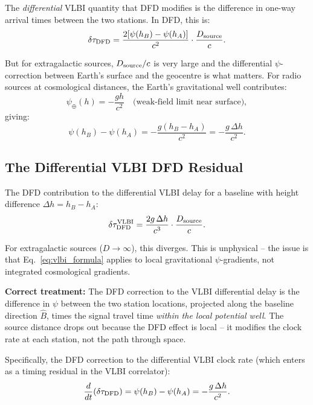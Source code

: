 \documentclass[aps,prd,twocolumn,superscriptaddress,nofootinbib]{revtex4-2}
\begin{document}
The \emph{differential} VLBI quantity that DFD modifies is the
difference in one-way arrival times between the two stations.
In DFD, this is:
\begin{equation}
\delta\tau_{\rm DFD} = \frac{2[\psi(h_B) - \psi(h_A)]}{c^2}
\cdot\frac{D_{\rm source}}{c}.
\end{equation}

But for extragalactic sources, $D_{\rm source}/c$ is very large and
the differential $\psi$-correction between Earth's surface and the
geocentre is what matters. For radio sources at cosmological distances,
the Earth's gravitational well contributes:
\begin{equation}
\psi_\oplus(h) = -\frac{g h}{c^2} \quad\text{(weak-field limit near surface)},
\end{equation}
giving:
\begin{equation}
\psi(h_B) - \psi(h_A) = -\frac{g(h_B - h_A)}{c^2}
= -\frac{g\,\Delta h}{c^2}.
\end{equation}

\subsection{The Differential VLBI DFD Residual}

The DFD contribution to the differential VLBI delay for a
baseline with height difference $\Delta h = h_B - h_A$:
\begin{equation}
\delta\tau_{\rm DFD}^{\rm VLBI}
= \frac{2g\,\Delta h}{c^3}\cdot\frac{D_{\rm source}}{c}.
\label{eq:vlbi_formula}
\end{equation}

For extragalactic sources ($D \to \infty$), this diverges.
This is unphysical -- the issue is that Eq.~\eqref{eq:vlbi_formula}
applies to local gravitational $\psi$-gradients, not integrated
cosmological gradients.

\textbf{Correct treatment:}
The DFD correction to the VLBI differential delay is the difference
in $\psi$ between the two station locations, projected along the
baseline direction $\hat{B}$, times the signal travel time
\emph{within the local potential well}. The source distance drops
out because the DFD effect is local -- it modifies the clock rate
at each station, not the path through space.

Specifically, the DFD correction to the differential VLBI clock rate
(which enters as a timing residual in the VLBI correlator):
\begin{equation}
\frac{d}{dt}(\delta\tau_{\rm DFD})
= \psi(h_B) - \psi(h_A) = -\frac{g\,\Delta h}{c^2}.
\label{eq:vlbi_rate}
\end{equation}
\end{document}
